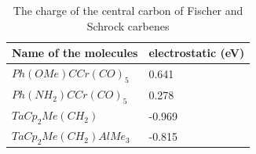 \documentclass[twocolumn]{article} %
\begin{document}
\begin{table}[h]
\caption{The charge of the central carbon of Fischer and Schrock carbenes}
\begin{tabular}{L{1.5in}C{1.5in}}\toprule
Name of the molecules  & electrostatic (eV)    \\ \hline
$Ph(OMe)CCr(CO)_5$    &  0.641\\
$Ph(NH_2)CCr(CO)_5$     &  0.278\\
$TaCp_2Me(CH_2)$     & -0.969 \\
$TaCp_2Me(CH_2)AlMe_3$ & -0.815\\\bottomrule
\end{tabular}
\end{table}











\end{document}
